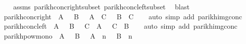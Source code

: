 \begin{isabellebody}
%
\isadelimproof
\ \ %
\endisadelimproof
%
\isatagproof
{}\isamarkupfalse%
\ assms\ parikh{\isacharunderscore}{\kern0pt}conc{\isacharunderscore}{\kern0pt}right{\isacharunderscore}{\kern0pt}subset\ parikh{\isacharunderscore}{\kern0pt}conc{\isacharunderscore}{\kern0pt}left{\isacharunderscore}{\kern0pt}subset\ \isamarkupfalse%
\ blast%
\endisatagproof
{\isafoldproof}%
%
\isadelimproof
\isanewline
%
\endisadelimproof
\isanewline
{}\isamarkupfalse%
\ parikh{\isacharunderscore}{\kern0pt}conc{\isacharunderscore}{\kern0pt}right{\isacharcolon}{\kern0pt}\ {\isachardoublequoteopen}{\isasymPsi}\ A\ {\isacharequal}{\kern0pt}\ {\isasymPsi}\ B\ {\isasymLongrightarrow}\ {\isasymPsi}\ {\isacharparenleft}{\kern0pt}A\ {\isacharat}{\kern0pt}{\isacharat}{\kern0pt}\ C{\isacharparenright}{\kern0pt}\ {\isacharequal}{\kern0pt}\ {\isasymPsi}\ {\isacharparenleft}{\kern0pt}B\ {\isacharat}{\kern0pt}{\isacharat}{\kern0pt}\ C{\isacharparenright}{\kern0pt}{\isachardoublequoteclose}\isanewline
%
\isadelimproof
\ \ %
\endisadelimproof
%
\isatagproof
{}\isamarkupfalse%
\ {\isacharparenleft}{\kern0pt}auto\ simp\ add{\isacharcolon}{\kern0pt}\ parikh{\isacharunderscore}{\kern0pt}img{\isacharunderscore}{\kern0pt}conc{\isacharparenright}{\kern0pt}%
\endisatagproof
{\isafoldproof}%
%
\isadelimproof
\isanewline
%
\endisadelimproof
\isanewline
{}\isamarkupfalse%
\ parikh{\isacharunderscore}{\kern0pt}conc{\isacharunderscore}{\kern0pt}left{\isacharcolon}{\kern0pt}\ {\isachardoublequoteopen}{\isasymPsi}\ A\ {\isacharequal}{\kern0pt}\ {\isasymPsi}\ B\ {\isasymLongrightarrow}\ {\isasymPsi}\ {\isacharparenleft}{\kern0pt}C\ {\isacharat}{\kern0pt}{\isacharat}{\kern0pt}\ A{\isacharparenright}{\kern0pt}\ {\isacharequal}{\kern0pt}\ {\isasymPsi}\ {\isacharparenleft}{\kern0pt}C\ {\isacharat}{\kern0pt}{\isacharat}{\kern0pt}\ B{\isacharparenright}{\kern0pt}{\isachardoublequoteclose}\isanewline
%
\isadelimproof
\ \ %
\endisadelimproof
%
\isatagproof
{}\isamarkupfalse%
\ {\isacharparenleft}{\kern0pt}auto\ simp\ add{\isacharcolon}{\kern0pt}\ parikh{\isacharunderscore}{\kern0pt}img{\isacharunderscore}{\kern0pt}conc{\isacharparenright}{\kern0pt}%
\endisatagproof
{\isafoldproof}%
%
\isadelimproof
\isanewline
%
\endisadelimproof
\isanewline
{}\isamarkupfalse%
\ parikh{\isacharunderscore}{\kern0pt}pow{\isacharunderscore}{\kern0pt}mono{\isacharcolon}{\kern0pt}\ {\isachardoublequoteopen}{\isasymPsi}\ A\ {\isasymsubseteq}\ {\isasymPsi}\ B\ {\isasymLongrightarrow}\ {\isasymPsi}\ {\isacharparenleft}{\kern0pt}A\ {\isacharcircum}{\kern0pt}{\isacharcircum}{\kern0pt}\ n{\isacharparenright}{\kern0pt}\ {\isasymsubseteq}\ {\isasymPsi}\ {\isacharparenleft}{\kern0pt}B\ {\isacharcircum}{\kern0pt}{\isacharcircum}{\kern0pt}\ n{\isacharparenright}{\kern0pt}{\isachardoublequoteclose}\isanewline

\end{isabellebody}
